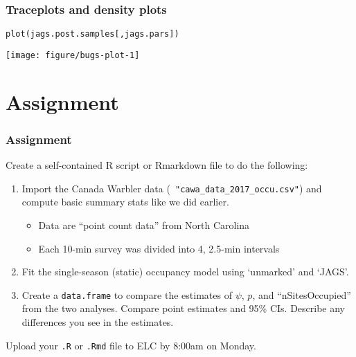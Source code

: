 \documentclass[color=usenames,dvipsnames]{beamer}\usepackage[]{graphicx}\usepackage[]{xcolor}
\makeatletter
\newcommand{\hldef}[1]{\textcolor[rgb]{0,0,0}{#1}}%
\newcommand{\hlkwd}[1]{\textcolor[rgb]{0.004,0.004,0.506}{#1}}%
\newenvironment{kframe}{%
 \def\at@end@of@kframe{}%
 \ifinner\ifhmode%
  \def\at@end@of@kframe{\end{minipage}}%
  \begin{minipage}{\columnwidth}%
 \fi\fi%
 \def\FrameCommand##1{\hskip\@totalleftmargin \hskip-\fboxsep
 \colorbox{shadecolor}{##1}\hskip-\fboxsep
     \hskip-\linewidth \hskip-\@totalleftmargin \hskip\columnwidth}%
 \MakeFramed {\advance\hsize-\width
   \@totalleftmargin\z@ \linewidth\hsize
   \@setminipage}}%
 {\par\unskip\endMakeFramed%
 \at@end@of@kframe}
\newenvironment{knitrout}{}{} %
\newcommand{\inr}[1]{\colorbox{inlinecolor}{\texttt{#1}}}
\makeatother
\begin{document}
\begin{frame}[fragile]
  \frametitle{Traceplots and density plots}
\begin{knitrout}\footnotesize
{}\color{fgcolor}\begin{kframe}
\begin{alltt}
\hlkwd{plot}\hldef{(jags.post.samples[,jags.pars])}
\end{alltt}
\end{kframe}

{\centering \texttt{[image: figure/bugs-plot-1]} 

}


\end{knitrout}
\end{frame}


\section{Assignment}











\begin{frame}
  \frametitle{Assignment}
  \small
  Create a self-contained R script or Rmarkdown file
  to do the following:
  \begin{enumerate}
    \small
    \item Import the Canada Warbler data ({\tt
      "cawa\_data\_2017\_occu.csv"}) and compute basic summary  stats
      like we did earlier. 
    \begin{itemize}
      \item Data are ``point count data'' from North Carolina
      \item Each 10-min survey was divided into 4, 2.5-min intervals 
    \end{itemize}
    \item Fit the single-season (static) occupancy model using
      `unmarked' and `JAGS'. 
    \item Create a \inr{data.frame} to compare the estimates of
      $\psi$, $p$, and ``nSitesOccupied'' from the two
      analyses. Compare point estimates and 95\% CIs. Describe any
      differences you see in the estimates.
  \end{enumerate}
  Upload your {\tt .R} or {\tt .Rmd} file to ELC by 8:00am on Monday. 
\end{frame}
\end{document}
